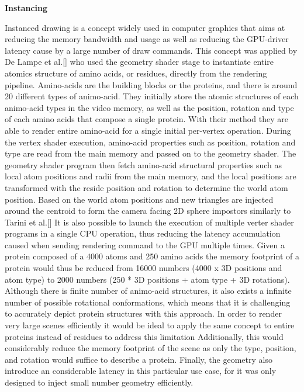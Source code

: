 \textbf{Instancing}

Instanced drawing is a concept widely used in computer graphics that aims at reducing the memory bandwidth and usage as well as reducing the GPU-driver latency cause by a large number of draw commands.
This concept was applied by De Lampe et al.[] who used the geometry shader stage to instantiate entire atomics structure of amino acids, or residues, directly from the rendering pipeline.
Amino-acids are the building blocks or the proteins, and there is around 20 different types of animo-acid.
They initially store the atomic structures of each animo-acid types in the video memory, as well as the position, rotation and type of each amino acids that compose a single protein.
With their method they are able to render entire amino-acid for a single initial per-vertex operation.
During the vertex shader execution, amino-acid properties such as position, rotation and type are read from the main memory and passed on to the geometry shader.
The geometry shader program then fetch amino-acid structural properties such as local atom positions and radii from the main memory, and the local positions are transformed with the reside position and rotation to determine the world atom position.
Based on the world atom positions and new triangles are injected around the centroid to form the camera facing 2D sphere impostors similarly to Tarini et al.[]
It is also possible to launch the execution of multiple verter shader programs in a single CPU operation, thus reducing the latency accumulation caused when sending rendering command to the GPU multiple times.
Given a protein composed of a 4000 atoms and 250 amino acids the memory footprint of a protein would thus be reduced from 16000 numbers (4000 x 3D positions and atom type) to 2000 numbers (250 * 3D positions + atom type + 3D rotations).
Although there is finite number of animo-acid structures, it also exists a infinite number of possible rotational conformations, which means that it is challenging to accurately depict protein structures with this approach.
In order to render very large scenes efficiently it would be ideal to apply the same concept to entire proteins instead of residues to address this limitation
Additionally, this would considerably reduce the memory footprint of the scene as only the type, position, and rotation would suffice to describe a protein.
Finally, the geometry also introduce an considerable latency in this particular use case, for it was only designed to inject small number geometry efficiently.

